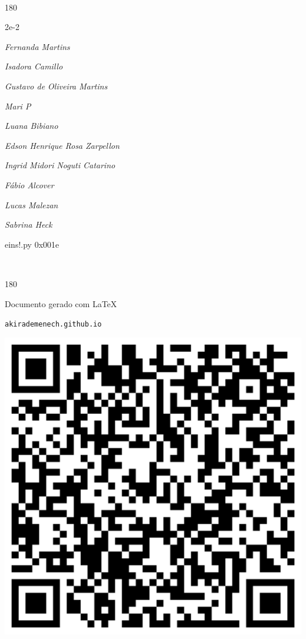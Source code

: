\documentclass[12pt]{article}
\begin{document}
	\ 
	\vfill
	\begin{turn}{180}	
		\begin{minipage}{\textwidth}
		  	\ttfamily %
			\centering
			{\Huge 2e-2}
		  
			\hfill
		  
			

\textit{\small Fernanda Martins}

\textit{\small Isadora Camillo}

\textit{\small Gustavo de Oliveira Martins}

\textit{\small Mari P}

\textit{\small Luana Bibiano}

\textit{\small Edson Henrique Rosa Zarpellon}

\textit{\small Ingrid Midori Noguti Catarino}

\textit{\small Fábio Alcover}

\textit{\small Lucas Malezan}

\textit{\small Sabrina Heck}

\bigskip

eins!.py
0x001e


		\end{minipage}	
	\end{turn}
	\vfill
	\

\pagebreak

	\begin{turn}{180}	
		\begin{minipage}{\textwidth}		  
		  Documento gerado com \LaTeX			
		  
		  \texttt{akirademenech.github.io}

		  \includegraphics[height=0.3\textheight]{2e-2.pdf}

		\end{minipage}	
	\end{turn}  
		  
\end{document}
